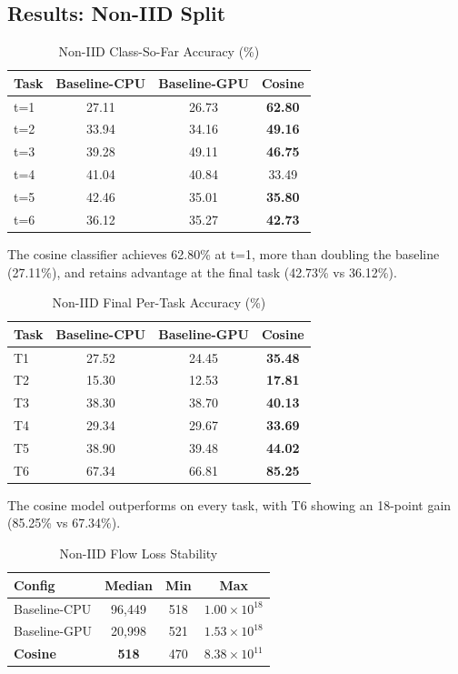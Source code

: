 \documentclass[conference]{IEEEtran}
\begin{document}
\subsection{Results: Non-IID Split}

\begin{table}[htbp]
\caption{Non-IID Class-So-Far Accuracy (\%)}
\centering
\begin{tabular}{lccc}
\toprule
Task & Baseline-CPU & Baseline-GPU & \textbf{Cosine} \\
\midrule
t=1 & 27.11 & 26.73 & \textbf{62.80} \\
t=2 & 33.94 & 34.16 & \textbf{49.16} \\
t=3 & 39.28 & 49.11 & \textbf{46.75} \\
t=4 & 41.04 & 40.84 & 33.49 \\
t=5 & 42.46 & 35.01 & \textbf{35.80} \\
t=6 & 36.12 & 35.27 & \textbf{42.73} \\
\bottomrule
\end{tabular}
\end{table}

The cosine classifier achieves 62.80\% at t=1, more than doubling the baseline (27.11\%), and retains advantage at the final task (42.73\% vs 36.12\%).

\begin{table}[htbp]
\caption{Non-IID Final Per-Task Accuracy (\%)}
\centering
\begin{tabular}{lccc}
\toprule
Task & Baseline-CPU & Baseline-GPU & \textbf{Cosine} \\
\midrule
T1 & 27.52 & 24.45 & \textbf{35.48} \\
T2 & 15.30 & 12.53 & \textbf{17.81} \\
T3 & 38.30 & 38.70 & \textbf{40.13} \\
T4 & 29.34 & 29.67 & \textbf{33.69} \\
T5 & 38.90 & 39.48 & \textbf{44.02} \\
T6 & 67.34 & 66.81 & \textbf{85.25} \\
\bottomrule
\end{tabular}
\end{table}

The cosine model outperforms on every task, with T6 showing an 18-point gain (85.25\% vs 67.34\%).

\begin{table}[htbp]
\caption{Non-IID Flow Loss Stability}
\centering
\begin{tabular}{lccc}
\toprule
Config & Median & Min & Max \\
\midrule
Baseline-CPU & 96,449 & 518 & $1.00\times10^{18}$ \\
Baseline-GPU & 20,998 & 521 & $1.53\times10^{18}$ \\
\textbf{Cosine} & \textbf{518} & 470 & $8.38\times10^{11}$ \\
\bottomrule
\end{tabular}
\end{table}
\end{document}
